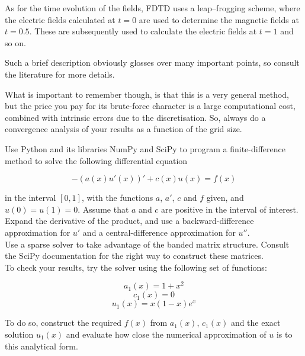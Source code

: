 As for the time evolution of the fields, FDTD uses a leap--frogging scheme, where the electric fields calculated at $t=0$ are used to determine the magnetic fields at $t=0.5$. These are subsequently used to calculate the electric fields at $t=1$ and so on.

Such a brief description obviously glosses over many important points, so consult the literature for more details.

What is important to remember though, is that this is a very general method, but the price you pay for its brute-force character is a large computational cost, combined with intrinsic errors due to the discretisation. So, always do a convergence analysis of your results as a function of the grid size.

\pagebreak

\begin{exer}
Use Python and its libraries NumPy and SciPy to program a finite-difference method to solve the following differential equation

$$ -\left(a(x) u'(x) \right)' + c(x)u(x) = f(x)$$

in the interval $[0,1]$, with the functions $a$, $a'$, $c$ and $f$ given, and $u(0) = u(1) = 0$. Assume that $a$ and $c$ are positive in the interval of interest.\\

Expand the derivative of the product, and use a backward-difference approximation for $u'$ and a central-difference approximation for $u''$. \\

Use a sparse solver to take advantage of the banded matrix structure. Consult the SciPy documentation for the right way to construct these matrices. \\

To check your results, try the solver using the following set of functions:

$$a_1(x) = 1 + x^2$$
$$c_1(x) = 0$$
$$u_1(x) = x(1-x) e^x $$

To do so, construct the required $f(x)$ from $a_1(x)$, $c_1(x)$ and the exact solution $u_1(x)$ and evaluate how close the numerical approximation of $u$ is to this analytical form.

\end{exer}



\pagebreak




